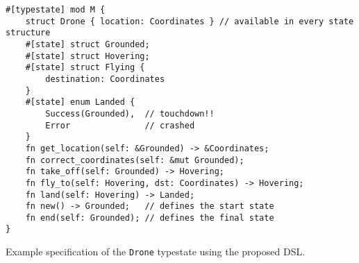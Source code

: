 \begin{listing}
    \centering
    \begin{verbatim}
#[typestate] mod M {
    struct Drone { location: Coordinates } // available in every state structure
    #[state] struct Grounded;
    #[state] struct Hovering;
    #[state] struct Flying {
        destination: Coordinates
    }
    #[state] enum Landed {
        Success(Grounded),  // touchdown!!
        Error               // crashed
    }
    fn get_location(self: &Grounded) -> &Coordinates;
    fn correct_coordinates(self: &mut Grounded);
    fn take_off(self: Grounded) -> Hovering;
    fn fly_to(self: Hovering, dst: Coordinates) -> Hovering;
    fn land(self: Hovering) -> Landed;
    fn new() -> Grounded;   // defines the start state
    fn end(self: Grounded); // defines the final state
}
    \end{verbatim}
    \caption{
        Example specification of the \texttt{Drone} typestate using the proposed DSL.
    }
    \label{lst:dsl-typestate-spec}
\end{listing}